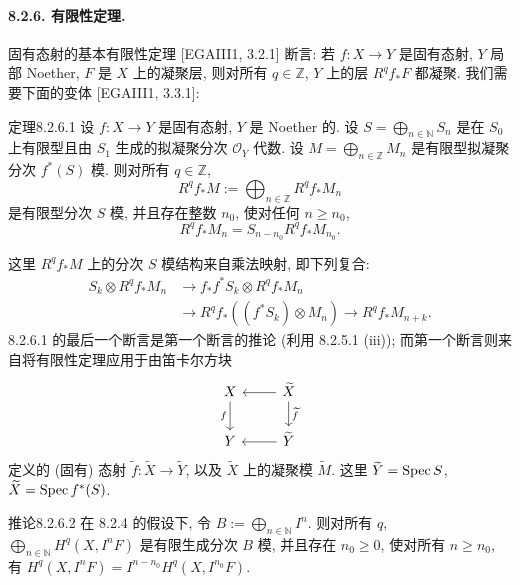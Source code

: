 \paragraph{8.2.6. 有限性定理.}
固有态射的基本有限性定理 [EGAIII1, 3.2.1] 断言: 若 $f:X\to Y$ 是固有态射, $Y$ 局部 Noether, $F$ 是 $X$ 上的凝聚层, 则对所有 $q\in\mathbb Z$, $Y$ 上的层 $R^qf_*F$ 都凝聚. 我们需要下面的变体 [EGAIII1, 3.3.1]:

\begin{origstatement}{定理}{8.2.6.1}\label{ch08:th8261}
设 $f:X\to Y$ 是固有态射, $Y$ 是 Noether 的. 设 $S=\bigoplus_{n\in\mathbb N}S_n$ 是在 $S_0$ 上有限型且由 $S_1$ 生成的拟凝聚分次 $\mathcal O_Y$ 代数. 设 $M=\bigoplus_{n\in\mathbb Z}M_n$ 是有限型拟凝聚分次 $f^*(S)$ 模. 则对所有 $q\in\mathbb Z$,
\[R^qf_*M:=\bigoplus_{n\in\mathbb Z}R^qf_*M_n\]
是有限型分次 $S$ 模, 并且存在整数 $n_0$, 使对任何 $n\geq n_0$,
\[R^qf_*M_n=S_{n-n_0}R^qf_*M_{n_0}.\]
\end{origstatement}
这里 $R^qf_*M$ 上的分次 $S$ 模结构来自乘法映射, 即下列复合:
\[\begin{aligned}
S_k\otimes R^qf_*M_n&\longrightarrow f_*f^*S_k\otimes R^qf_*M_n\\
&\longrightarrow R^qf_*((f^*S_k)\otimes M_n)\longrightarrow R^qf_*M_{n+k}.
\end{aligned}\]
8.2.6.1 的最后一个断言是第一个断言的推论 (利用 8.2.5.1 (iii)); 而第一个断言则来自将有限性定理应用于由笛卡尔方块
\[\begin{tikzcd}X\arrow[d,"f"']&\widetilde X\arrow[l]\arrow[d,"\widetilde f"]\\Y&\widetilde Y\arrow[l]\end{tikzcd}\]
定义的 (固有) 态射 $\widetilde f:\widetilde X\to\widetilde Y$, 以及 $\widetilde X$ 上的凝聚模 $\widetilde M$. 这里 $\widetilde Y=\operatorname{Spec} S$, $\widetilde X=\operatorname{Spec} f^*(S)$.

\begin{origstatement}{推论}{8.2.6.2}\label{ch08:cor8262}
在 8.2.4 的假设下, 令 $B:=\bigoplus_{n\in\mathbb N}I^n$. 则对所有 $q$, $\bigoplus_{n\in\mathbb N}H^q(X,I^nF)$ 是有限生成分次 $B$ 模, 并且存在 $n_0\geq0$, 使对所有 $n\geq n_0$, 有 $H^q(X,I^nF)=I^{n-n_0}H^q(X,I^{n_0}F)$.
\end{origstatement}

